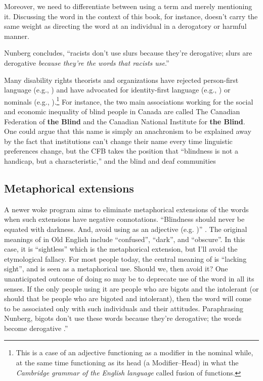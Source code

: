 Moreover, we need to differentiate between using a term and merely mentioning it. Discussing the word  in the context of this book, for instance, doesn't carry the same weight as directing the word at an individual in a derogatory or harmful manner.




Nunberg concludes, ``racists don't use slurs because they're derogative; slurs are derogative \textit{because they're the words that racists use}.'' \citep[244]{Nunberg2018}

Many disability rights theorists and organizations have rejected person-first language (e.g., ) and have advocated for identity-first language (e.g., ) or nominals (e.g., ).\footnote{This is a case of an adjective functioning as a modifier in the nominal while, at the same time functioning as its head (a Modifier--Head) in what the \textit{Cambridge grammar of the English language} called fusion of functions.} For instance, the two main associations working for the social and economic inequality of blind people in Canada are called The Canadian Federation of \textbf{the Blind} and the Canadian National Institute for \textbf{the Blind}. One could argue that this name is simply an anachronism to be explained away by the fact that institutions can't change their name every time linguistic preferences change, but the CFB takes the position that ``blindness is not a handicap, but a characteristic,'' and the blind and deaf communities

\subsection{Metaphorical extensions}
A newer woke program aims to eliminate metaphorical extensions of the words when such extensions have negative connotations. ``Blindness should never be equated with darkness. And, avoid using  as an adjective (e.g. )'' \citep[8]{Jones2017}. The original meanings of  in Old English include ``confused'', ``dark'', and ``obscure''. In this case, it is ``sightless'' which is the metaphorical extension, but I'll avoid the etymological fallacy. For most people today, the central meaning of  is ``lacking sight'', and  is seen as a metaphorical use. Should we, then avoid it? One unanticipated outcome of doing so may be to deprecate use of the word in all its senses. If the only people using it are people who are bigots and the intolerant (or should that be people who are bigoted and intolerant), then the word will come to be associated only with such individuals and their attitudes. Paraphrasing Nunberg, bigots don't use these words because they're derogative; the words become derogative .''


